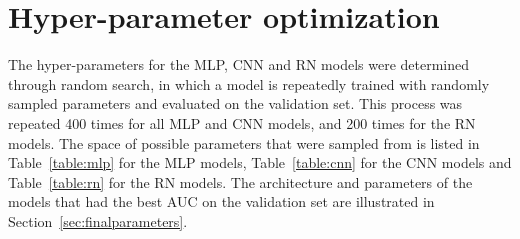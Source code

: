 \documentclass[preprint]{elsarticle}
\begin{document}
\section{Hyper-parameter optimization}
The hyper-parameters for the MLP, CNN and RN models were determined through random search, in which a model is repeatedly trained with randomly sampled parameters and evaluated on the validation set. This process was repeated 400 times for all MLP and CNN models, and 200 times for the RN models. The space of possible parameters that were sampled from is listed in Table~\ref{table:mlp} for the MLP models, Table~\ref{table:cnn} for the CNN models and Table~\ref{table:rn} for the RN models. The architecture and parameters of the models that had the best AUC on the validation set are illustrated in Section~\ref{sec:finalparameters}. 

\end{document}
